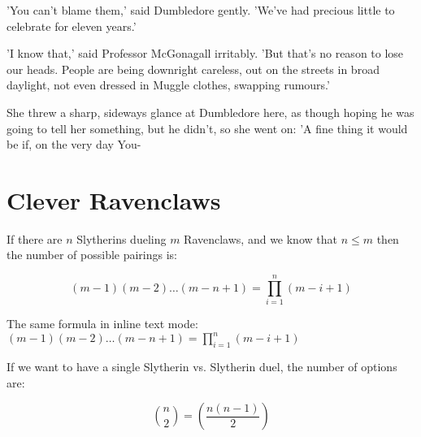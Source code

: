 \documentclass[twoside, openany]{report}
\begin{document}
'You can't blame them,' said Dumbledore gently. 'We've had 
precious little to celebrate for eleven years.' 

'I know that,' said Professor McGonagall irritably. 'But that's no 
reason to lose our heads. People are being downright careless, out 
on the streets in broad daylight, not even dressed in Muggle 
clothes, swapping rumours.' \cite{Wong2023}

She threw a sharp, sideways glance at Dumbledore here, as 
though hoping he was going to tell her something, but he didn't, 
so she went on: 'A fine thing it would be if, on the very day You- 

\chapter{Clever Ravenclaws}

If there are $n$ Slytherins dueling $m$ Ravenclaws, and we know that $n \le m$ then the number of possible pairings is: 

\[
    (m-1) (m-2) \dots (m-n+1) = \prod_{i=1}^{n} (m-i+1)
\]

The same formula in inline text mode: $(m-1) (m-2) \dots (m-n+1) = \prod_{i=1}^{n} (m-i+1)$

If we want to have a single Slytherin vs. Slytherin duel, the number of options are:

\[
  \binom{n}{2} = \left(\frac {n(n-1)} {2}\right)
\]



    
\end{document}
